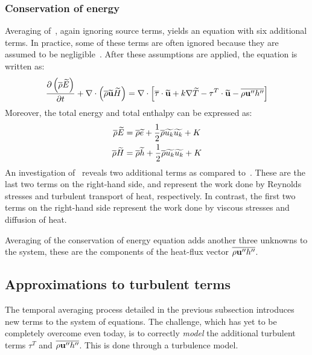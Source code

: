 \subsubsection{Conservation of energy}
%
Averaging of~, again ignoring source terms, yields an equation with six additional terms. In practice, some of these terms are often ignored because they are assumed to be negligible~\cite{blazek2015computational}. After these assumptions are applied, the equation is written as:
\begin{align}
     \frac{\partial \left(\overline{\rho}\widetilde{E}\right)}{\partial t} 
    + \nabla\cdot\left(\overline{\rho} \widetilde{\mathbf{u}} \widetilde{H}\right)
    =
    \nabla\cdot\left[
        \overline{\tau}\cdot\widetilde{\mathbf{u}}
        + k\nabla\widetilde{T}
         -\tau^T\cdot\widetilde{\mathbf{u}}
         - \overline{\rho \mathbf{u}'' h''}
    \right]
    \label{eq:renergy}
\end{align}
Moreover, the total energy and total enthalpy can be expressed as:
\begin{align*}
    \overline{\rho}\widetilde{E} &= \overline{\rho}\widetilde{e}
        + \frac{1}{2}\overline{\rho}\widetilde{u_k}\widetilde{u_k} + K\\
    \overline{\rho}\widetilde{H} &= \overline{\rho}\widetilde{h}
        + \frac{1}{2}\overline{\rho}\widetilde{u_k}\widetilde{u_k} + K
\end{align*}
%
An investigation of~ reveals two additional terms as compared to~. These are the last two terms on the right-hand side, and represent the work done by Reynolds stresses and turbulent transport of heat, respectively. In contrast, the first two terms on the right-hand side represent the work done by viscous stresses and diffusion of heat.

Averaging of the conservation of energy equation adds another three unknowns to the system, these are the components of the heat-flux vector $\overline{\rho \mathbf{u}'' h''}$.
\subsection{Approximations to turbulent terms}
%
\label{sec:bouss}
The temporal averaging process detailed in the previous subsection introduces new terms to the system of equations. The challenge, which
has yet to be completely overcome even today, is to correctly
\textit{model} the additional turbulent terms $\tau^T$ and
$\overline{\rho \mathbf{u}'' h''}$. This is done through a turbulence model.

